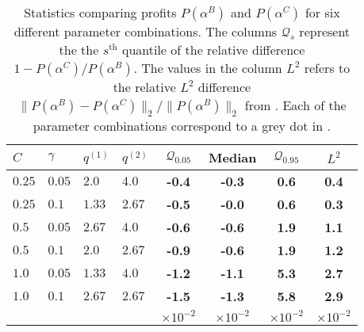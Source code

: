 \documentclass[main.tex]{subfiles}
\begin{document}
\begin{table}[htbp]
  \centering
  \begin{tabular}{llllcccc}
    \toprule
    $C$ & $\gamma$ & $q^{(1)}$ & $q^{(2)}$ & $\mathcal{Q}_{0.05}$
    &Median & $\mathcal{Q}_{0.95}$ &$L^2$\\
    \midrule
    $0.25$ & $0.05$ & $2.0$ & $4.0$  & \textbf{-0.4} & \textbf{-0.3} & \textbf{0.6} & \textbf{0.4}\\
    $0.25$ & $0.1$ & $1.33$ & $2.67$ & \textbf{-0.5} & \textbf{-0.0} & \textbf{0.6} & \textbf{0.3}\\
    $0.5$ & $0.05$ & $2.67$ & $4.0$  & \textbf{-0.6} & \textbf{-0.6} & \textbf{1.9} & \textbf{1.1}\\
    $0.5$ & $0.1$ & $2.0$ & $2.67$   & \textbf{-0.9} & \textbf{-0.6} & \textbf{1.9} & \textbf{1.2}\\
    $1.0$ & $0.05$ & $1.33$ & $4.0$  & \textbf{-1.2} & \textbf{-1.1} & \textbf{5.3} & \textbf{2.7}\\
    $1.0$ & $0.1$ & $2.67$ & $2.67$  & \textbf{-1.5} & \textbf{-1.3} & \textbf{5.8} & \textbf{2.9}\\
        &&&&$\times 10^{-2}$&$\times 10^{-2}$&$\times 10^{-2}$&$\times 10^{-2}$\\
    \bottomrule
  \end{tabular}
  \caption[Statistics comparing the profits of the Bellman and CEC policies]{Statistics comparing profits $P(\alpha^B)$ and $P(\alpha^C)$ for six different
    parameter combinations. The columns $\mathcal{Q}_s$ represent the
    the $s^{\text{th}}$ quantile of the relative
    difference
    $1-P(\alpha^C)/P(\alpha^B)$. %
    The values in the column $L^2$ refers to the relative $L^2$
    difference $\|P(\alpha^B)-P(\alpha^C)\|_2/\|P(\alpha^B)\|_2$
    from . Each of the parameter
    combinations correspond to a grey dot in .
  }\label{tbl:paramcomparisons}
\end{table}
\end{document}
